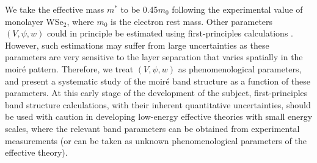 \documentclass[aps,prx,floatfix,twocolumn]{revtex4-1}
\begin{document}
	We take the effective mass $m^*$ to be 0.45$m_0$ following the experimental value \cite{fallahazad2016shubnikov} of monolayer WSe$_2$, where $m_0$ is the electron rest mass. Other parameters $(V, \psi, w)$ could in principle be  estimated using first-principles  calculations \cite{wu2018hubbard, wu2019topological, naik2018ultraflatbands, zhang2019moir}. However, such estimations may suffer from large uncertainties as these parameters are very sensitive to the layer separation that  varies spatially in the moir\'e pattern. Therefore, we treat $(V, \psi, w)$ as phenomenological parameters, and present a systematic study of the moir\'e band structure as a function of these parameters. At this early stage of the development of the subject, first-principles band structure calculations, with their inherent quantitative uncertainties, should be used with caution in developing low-energy effective theories with small energy scales, where the relevant band parameters can be obtained from experimental measurements (or can be taken as unknown phenomenological parameters of the effective theory).
	 


	

	
\end{document}
